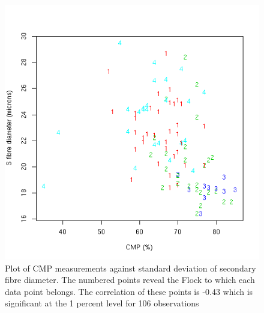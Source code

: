 %

\begin{figure}[!h]
  \centering
  \includegraphics[width=1.0\textwidth]{cmpdssd.png}
  \caption{Plot of CMP measurements against standard deviation of secondary fibre diameter. The numbered points reveal the Flock to which each data point belongs. The correlation of these points is -0.43 which is significant at the 1 percent level for 106 observations}
  \label{fig:cmpdssd}
\end{figure}

%

